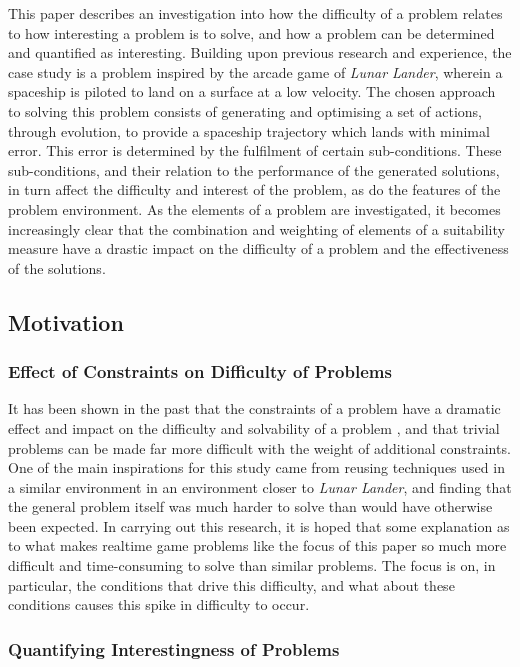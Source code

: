 \documentclass[conference]{IEEEtran}
\begin{document}
This paper describes an investigation into how the difficulty of a problem relates to how interesting a problem is to solve, and how a problem can be determined and quantified as interesting. Building upon previous research and experience, the case study is a problem inspired by the arcade game of {\itshape Lunar Lander}, wherein a spaceship is piloted to land on a surface at a low velocity. The chosen approach to solving this problem consists of generating and optimising a set of actions, through evolution, to provide a spaceship trajectory which lands with minimal error. This error is determined by the fulfilment of certain sub-conditions. These sub-conditions, and their relation to the performance of the generated solutions, in turn affect the difficulty and interest of the problem, as do the features of the problem environment. As the elements of a problem are investigated, it becomes increasingly clear that the combination and weighting of elements of a suitability measure have a drastic impact on the difficulty of a problem and the effectiveness of the solutions.

\subsection{Motivation}

\subsubsection{Effect of Constraints on Difficulty of Problems}

It has been shown in the past that the constraints of a problem have a dramatic effect and impact on the difficulty and solvability of a problem \cite{kramer10}, and that trivial problems can be made far more difficult with the weight of additional constraints. One of the main inspirations for this study came from reusing techniques used in a similar environment in an environment closer to {\itshape Lunar Lander}, and finding that the general problem itself was much harder to solve than would have otherwise been expected. In carrying out this research, it is hoped that some explanation as to what makes realtime game problems like the focus of this paper so much more difficult and time-consuming to solve than similar problems. The focus is on, in particular, the conditions that drive this difficulty, and what about these conditions causes this spike in difficulty to occur.

\subsubsection{Quantifying Interestingness of Problems}
\end{document}
